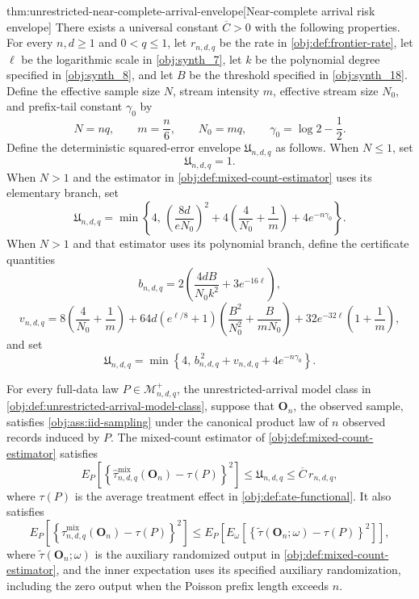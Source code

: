\begin{theoremv}{thm:unrestricted-near-complete-arrival-envelope}[Near-complete arrival risk envelope]
There exists a universal constant \(\overline C>0\) with the following properties. For every \(n,d\ge1\) and \(0<q\le1\), let \(r_{n,d,q}\) be the rate in \cref{obj:def:frontier-rate}, let \(\ell\) be the logarithmic scale in \cref{obj:synth_7}, let \(k\) be the polynomial degree specified in \cref{obj:synth_8}, and let \(B\) be the threshold specified in \cref{obj:synth_18}. Define the effective sample size \(N\), stream intensity \(m\), effective stream size \(N_0\), and prefix-tail constant \(\gamma_0\) by
\[
N=nq,\qquad m=\frac n6,\qquad N_0=mq,\qquad
\gamma_0=\log 2-\frac12.
\]
Define the deterministic squared-error envelope \(\mathfrak U_{n,d,q}\) as follows. When \(N\le1\), set
\[
\mathfrak U_{n,d,q}=1.
\]
When \(N>1\) and the estimator in \cref{obj:def:mixed-count-estimator} uses its elementary branch, set
\[
\mathfrak U_{n,d,q}
=
\min\left\{
4,\,
\left(\frac{8d}{eN_0}\right)^2
+4\left(\frac4{N_0}+\frac1m\right)
+4e^{-n\gamma_0}
\right\}.
\]
When \(N>1\) and that estimator uses its polynomial branch, define the certificate quantities
\[
b_{n,d,q}
=
2\left(\frac{4dB}{N_0k^2}+3e^{-16\ell}\right),
\]
\[
v_{n,d,q}
=
8\left(\frac4{N_0}+\frac1m\right)
+64d\left(e^{\ell/8}+1\right)
\left(\frac{B^2}{N_0^2}+\frac{B}{mN_0}\right)
+32e^{-32\ell}\left(1+\frac1m\right),
\]
and set
\[
\mathfrak U_{n,d,q}
=
\min\left\{
4,\,
b_{n,d,q}^{\,2}+v_{n,d,q}+4e^{-n\gamma_0}
\right\}.
\]

For every full-data law \(P\in\mathcal M^{+}_{n,d,q}\), the unrestricted-arrival model class in \cref{obj:def:unrestricted-arrival-model-class}, suppose that \(\mathbf O_n\), the observed sample, satisfies \cref{obj:ass:iid-sampling} under the canonical product law of \(n\) observed records induced by \(P\). The mixed-count estimator of \cref{obj:def:mixed-count-estimator} satisfies
\[
E_P\!\left[
\left\{
\widehat\tau^{\mathrm{mix}}_{n,d,q}(\mathbf O_n)-\tau(P)
\right\}^{2}
\right]
\le \mathfrak U_{n,d,q}
\le \overline C\,r_{n,d,q},
\]
where \(\tau(P)\) is the average treatment effect in \cref{obj:def:ate-functional}. It also satisfies
\[
E_P\!\left[
\left\{
\widehat\tau^{\mathrm{mix}}_{n,d,q}(\mathbf O_n)-\tau(P)
\right\}^{2}
\right]
\le
E_P\!\left[
E_\omega\!\left[
\left\{
\widetilde\tau(\mathbf O_n;\omega)-\tau(P)
\right\}^{2}
\right]
\right],
\]
where \(\widetilde\tau(\mathbf O_n;\omega)\) is the auxiliary randomized output in \cref{obj:def:mixed-count-estimator}, and the inner expectation uses its specified auxiliary randomization, including the zero output when the Poisson prefix length exceeds \(n\).


\end{theoremv}
